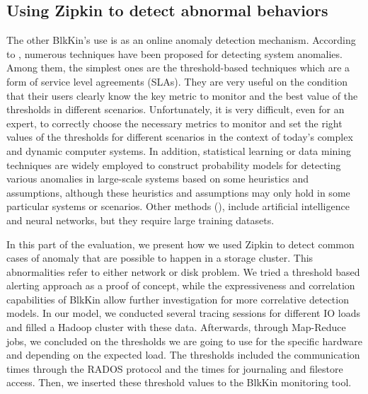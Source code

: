 \subsection{Using Zipkin to detect abnormal behaviors}

The other BlkKin's use is as an online anomaly detection mechanism. According to
\cite{china-detector}, numerous techniques have been proposed for detecting
system anomalies. Among them, the simplest ones are the threshold-based
techniques which are a form of service level agreements (SLAs). They are very
useful on the condition that their users clearly know the key metric to monitor
and the best value of the thresholds in different scenarios. Unfortunately, it
is very difficult, even for an expert, to correctly choose the necessary metrics
to monitor and set the right values of the thresholds for different scenarios in
the context of today's complex and dynamic computer systems. In addition,
statistical learning or data mining techniques are widely employed to construct
probability models for detecting various anomalies in large-scale systems based
on some heuristics and assumptions, although these heuristics and assumptions
may only hold in some particular systems or scenarios. Other methods
(\cite{syslog-svm}), include artificial intelligence and neural networks, but
they require large training datasets.

In this part of the evaluation, we present how we used Zipkin to detect common
cases of anomaly that are possible to happen in a storage cluster. This
abnormalities refer to either network or disk problem. We tried a threshold
based alerting approach as a proof of concept, while the expressiveness and
correlation capabilities of BlkKin allow further investigation for more
correlative detection models. In our model, we conducted several tracing
sessions for different IO loads and filled a Hadoop cluster with these data.
Afterwards, through Map-Reduce jobs, we concluded on the thresholds we are going
to use for the specific hardware and depending on the expected load. The
thresholds included the communication times through the RADOS protocol and the
times for journaling and filestore access. Then, we inserted these threshold
values to the BlkKin monitoring tool. 

